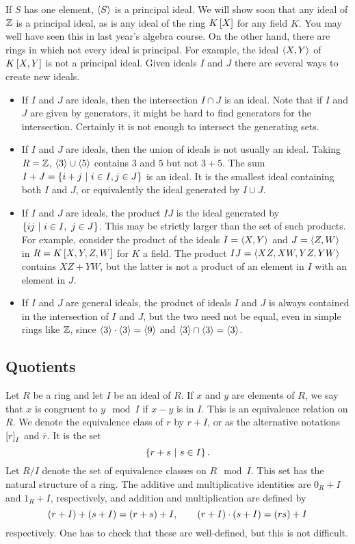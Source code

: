 If $ S $ has one element, $ \left\langle S \right\rangle $ is a principal ideal. We will show soon that any ideal of $ \mathbb{Z} $ is a principal ideal, as is any ideal of the ring $ K\sbr{X} $ for any field $ K $. You may well have seen this in last year's
algebra course. On the other hand, there are rings in which not every ideal is principal. For example, the ideal $ \left\langle X, Y \right\rangle $ of $ K\sbr{X, Y} $ is not a principal ideal. Given ideals $ I $ and $ J $ there are several ways to create new ideals.

\begin{example*}
\hfill
\begin{itemize}
\item If $ I $ and $ J $ are ideals, then the intersection $ I \cap J $ is an ideal. Note that if $ I $ and $ J $ are given by generators, it might be hard to find generators for the intersection. Certainly it is not enough to intersect the generating sets.
\item If $ I $ and $ J $ are ideals, then the union of ideals is not usually an ideal. Taking $ R = \mathbb{Z} $, $ \left\langle 3 \right\rangle \cup \left\langle 5 \right\rangle $ contains $ 3 $ and $ 5 $ but not $ 3 + 5 $. The sum $ I + J = \cbr{i + j \st i \in I, j \in J} $ is an ideal. It is the smallest ideal containing both $ I $ and $ J $, or equivalently the ideal generated by $ I \cup J $.
\item If $ I $ and $ J $ are ideals, the product $ IJ $ is the ideal generated by $ \cbr{ij \st i \in I, \ j \in J} $. This may be strictly larger than the set of such products. For example, consider the product of the ideals $ I = \left\langle X, Y \right\rangle $ and $ J = \left\langle Z, W \right\rangle $ in $ R = K\sbr{X, Y, Z, W} $ for $ K $ a field. The product $ IJ = \left\langle XZ, XW, YZ, YW \right\rangle $ contains $ XZ + YW $, but the latter is not a product of an element in $ I $ with an element in $ J $.
\item If $ I $ and $ J $ are general ideals, the product of ideals $ I $ and $ J $ is always contained in the intersection of $ I $ and $ J $, but the two need not be equal, even in simple rings like $ \mathbb{Z} $, since $ \left\langle 3 \right\rangle \cdot \left\langle 3 \right\rangle = \left\langle 9 \right\rangle $ and $ \left\langle 3 \right\rangle \cap \left\langle 3 \right\rangle = \left\langle 3 \right\rangle $.
\end{itemize}
\end{example*}

\subsection{Quotients}

Let $ R $ be a ring and let $ I $ be an ideal of $ R $. If $ x $ and $ y $ are elements of $ R $, we say that $ x $ is congruent to $ y \mod I $ if $ x - y $ is in $ I $. This is an equivalence relation on $ R $. We denote the equivalence class of $ r $ by $ r + I $, or as the alternative notations $ \sbr{r}_I $ and $ \overline{r} $. It is the set
$$ \cbr{r + s \st s \in I}. $$
Let $ R / I $ denote the set of equivalence classes on $ R \mod I $. This set has the natural structure of a ring. The additive and multiplicative identities are $ 0_R + I $ and $ 1_R + I $, respectively, and addition and multiplication are defined by
$$ \br{r + I} + \br{s + I} = \br{r + s} + I, \qquad \br{r + I} \cdot \br{s + I} = \br{rs} + I $$
respectively. One has to check that these are well-defined, but this is not difficult.

